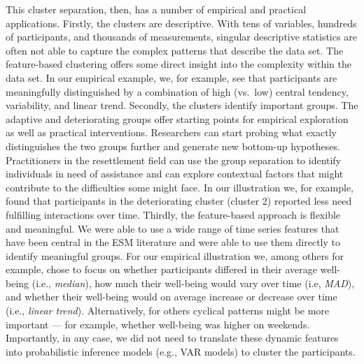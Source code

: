 This cluster separation, then, has a number of empirical and practical
applications. Firstly, the clusters are descriptive. With tens of
variables, hundreds of participants, and thousands of measurements,
singular descriptive statistics are often not able to capture the
complex patterns that describe the data set. The feature-based
clustering offers some direct insight into the complexity within the
data set. In our empirical example, we, for example, see that
participants are meaningfully distinguished by a combination of high
(vs.~low) central tendency, variability, and linear trend. Secondly, the
clusters identify important groups. The adaptive and deteriorating
groups offer starting points for empirical exploration as well as
practical interventions. Researchers can start probing what exactly
distinguishes the two groups further and generate new bottom-up
hypotheses. Practitioners in the resettlement field can use the group
separation to identify individuals in need of assistance and can explore
contextual factors that might contribute to the difficulties some might
face. In our illustration we, for example, found that participants in
the deteriorating cluster (cluster 2) reported less need fulfilling
interactions over time. Thirdly, the feature-based approach is flexible
and meaningful. We were able to use a wide range of time series features
that have been central in the ESM literature and were able to use them
directly to identify meaningful groups. For our empirical illustration
we, among others for example, chose to focus on whether participants
differed in their average well-being (i.e., \textit{median}), how much
their well-being would vary over time (i.e, \textit{MAD}), and whether
their well-being would on average increase or decrease over time (i.e.,
\textit{linear trend}). Alternatively, for others cyclical patterns
might be more important --- for example, whether well-being was higher
on weekends. Importantly, in any case, we did not need to translate
these dynamic features into probabilistic inference models (e.g., VAR
models) to cluster the participants.

